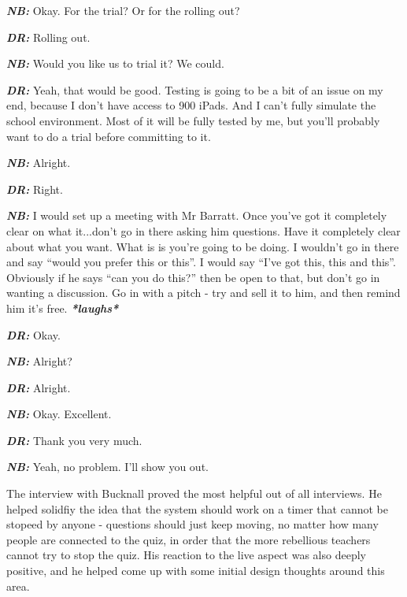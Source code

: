 \textit{\textbf{NB:}} Okay. For the trial? Or for the rolling out?

\textit{\textbf{DR:}} Rolling out.

\textit{\textbf{NB:}} Would you like us to trial it? We could.

\textit{\textbf{DR:}} Yeah, that would be good. Testing is going to be a bit of an issue on my end, because I don't have access to 900 iPads. And I can't fully simulate the school environment. Most of it will be fully tested by me, but you'll probably want to do a trial before committing to it.

\textit{\textbf{NB:}} Alright.

\textit{\textbf{DR:}} Right.

\textit{\textbf{NB:}} I would set up a meeting with Mr Barratt. Once you've got it completely clear on what it...don't go in there asking him questions. Have it completely clear about what you want. What is is you're going to be doing. I wouldn't go in there and say ``would you prefer this or this''. I would say ``I've got this, this and this''. Obviously if he says ``can you do this?'' then be open to that, but don't go in wanting a discussion. Go in with a pitch - try and sell it to him, and then remind him it's free. \textit{\textbf{*laughs*}}

\textit{\textbf{DR:}} Okay.

\textit{\textbf{NB:}} Alright?

\textit{\textbf{DR:}} Alright.

\textit{\textbf{NB:}} Okay. Excellent.

\textit{\textbf{DR:}} Thank you very much.

\textit{\textbf{NB:}} Yeah, no problem. I'll show you out.

The interview with Bucknall proved the most helpful out of all interviews. He helped solidfiy the idea that the system should work on a timer that cannot be stopeed by anyone - questions should just keep moving, no matter how many people are connected to the quiz, in order that the more rebellious teachers cannot try to stop the quiz. His reaction to the live aspect was also deeply positive, and he 
helped come up with some initial design thoughts around this area.
